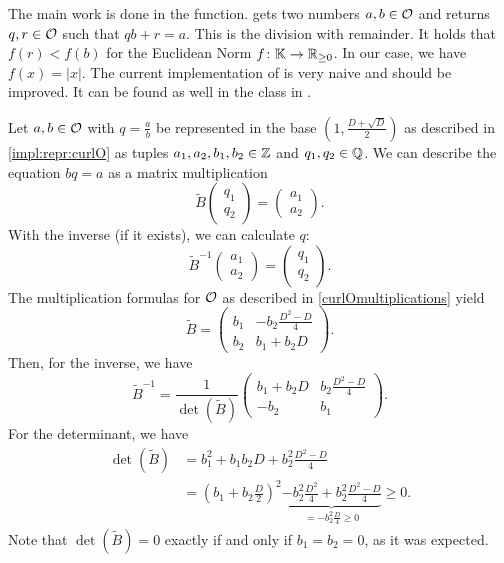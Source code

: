 The main work is done in the  function.  gets two numbers $a, b \in \mathcal{O}$ and returns $q, r \in \mathcal{O}$ such that $q b + r = a$. This is the division with remainder. It holds that $f(r) < f(b)$ for the Euclidean Norm $f \colon \mathbb{K} \rightarrow \mathbb{R}_{\ge 0}$. In our case, we have $f(x) = |x|$. The current implementation of  is very naive and should be improved. It can be found as well in the class  in .

Let $a,b \in \mathcal{O}$ with $q = \tfrac{a}{b}$ be represented in the base $(1, \frac{D + \sqrt{D}} {2})$ as described in \cref{impl:repr:curlO} as tuples $a_1,a_2,b_1,b_2 \in \mathbb{Z}$ and $q_1,q_2 \in \mathbb{Q}$. We can describe the equation $bq = a$ as a matrix multiplication
\[ \tilde{B} \begin{pmatrix} q_1 \\ q_2 \end{pmatrix} = \begin{pmatrix} a_1 \\ a_2 \end{pmatrix} . \]
With the inverse (if it exists), we can calculate $q$:
\[ \tilde{B}^{-1} \begin{pmatrix} a_1 \\ a_2 \end{pmatrix} = \begin{pmatrix} q_1 \\ q_2 \end{pmatrix} . \]
The multiplication formulas for $\mathcal{O}$ as described in \cref{curlOmultiplications} yield
\[ \tilde{B} = \begin{pmatrix}
b_1 & -b_2 \frac{D^2 - D}{4} \\
b_2 & b_1 + b_2 D
\end{pmatrix} . \]
Then, for the inverse, we have
\[ \tilde{B}^{-1} = \frac{1}{\det(\tilde{B})}
\begin{pmatrix}
b_1 + b_2 D & b_2 \frac{D^2 - D}{4} \\
-b_2 & b_1
\end{pmatrix} . \]
For the determinant, we have
\begin{align*}
\det(\tilde{B}) &= b_1^2 + b_1 b_2 D + b_2^2 \frac{D^2-D}{4} \\
&= (b_1 + b_2 \tfrac{D}{2})^2 \underbrace{- b_2^2 \tfrac{D^2}{4} + b_2^2 \tfrac{D^2-D}{4}}_{
= -b_2^2 \tfrac{D}{4} \ge 0} \ge 0.
\end{align*}
Note that $\det(\tilde{B}) = 0$ exactly if and only if $b_1 = b_2 = 0$, as it was expected.

